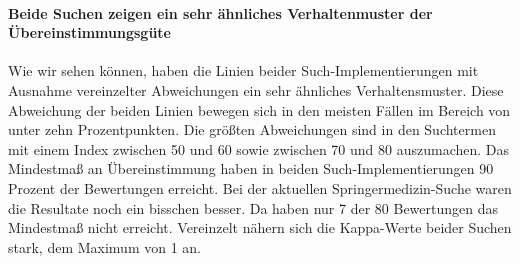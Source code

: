 \paragraph{Beide Suchen zeigen ein sehr ähnliches Verhaltenmuster der Übereinstimmungsgüte} Wie wir sehen können, haben die Linien beider Such-Implementierungen mit Ausnahme vereinzelter Abweichungen ein sehr ähnliches Verhaltensmuster. Diese Abweichung der beiden Linien bewegen sich in den meisten Fällen im Bereich von unter zehn Prozentpunkten. Die größten Abweichungen sind in den Suchtermen mit einem Index zwischen 50 und 60 sowie zwischen 70 und 80 auszumachen. Das Mindestmaß an Übereinstimmung haben in beiden Such-Implementierungen 90 Prozent der Bewertungen erreicht. Bei der aktuellen Springermedizin-Suche waren die Resultate noch ein bisschen besser. Da haben nur 7 der 80 Bewertungen das Mindestmaß nicht erreicht. Vereinzelt nähern sich die Kappa-Werte beider Suchen stark, dem Maximum von 1 an. 
